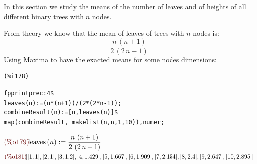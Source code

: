 In this section we study the means of the number of leaves and of
heights of all different binary trees with $n$ nodes.

From theory we know that the mean of leaves of trees with $n$ nodes
is:
\begin{displaymath}
  \frac{n\,\left( n+1\right)  }{2\,\left( 2\,n-1\right) }
\end{displaymath}
Using Maxima to have the exacted means for some nodes dimensions:

\noindent
\begin{minipage}[t]{8ex}{\color{red}\bf
\begin{verbatim}
(%i178) 
\end{verbatim}}
\end{minipage}
\begin{minipage}[t]{\textwidth}{\color{blue}
\begin{verbatim}
fpprintprec:4$
leaves(n):=(n*(n+1))/(2*(2*n-1));
combineResult(n):=[n,leaves(n)]$
map(combineResult, makelist(n,n,1,10)),numer;
\end{verbatim}}
\end{minipage}
\begin{math}\displaystyle
\parbox{8ex}{\color{labelcolor}(\%o179) }
\mathrm{leaves}\left( n\right) :=\frac{n\,\left( n+1\right)
}{2\,\left( 2\,n-1\right) }
\end{math}\\
\begin{math}\displaystyle
\parbox{8ex}{\color{labelcolor}(\%o181) }
[[1,1],[2,1],[3,1.2],[4,1.429],[5,1.667],[6,1.909],[7,2.154],[8,2.4],
[9,2.647],[10,2.895]]
\end{math}\\

